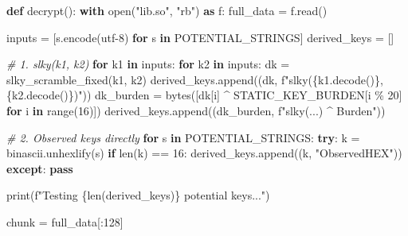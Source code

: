 \documentclass[
]{article}
\newenvironment{Shaded}{}{}
\newcommand{\BuiltInTok}[1]{\textcolor[rgb]{0.00,0.50,0.00}{#1}}
\newcommand{\CommentTok}[1]{\textcolor[rgb]{0.38,0.63,0.69}{\textit{#1}}}
\newcommand{\ControlFlowTok}[1]{\textcolor[rgb]{0.00,0.44,0.13}{\textbf{#1}}}
\newcommand{\DecValTok}[1]{\textcolor[rgb]{0.25,0.63,0.44}{#1}}
\newcommand{\ImportTok}[1]{\textcolor[rgb]{0.00,0.50,0.00}{\textbf{#1}}}
\newcommand{\KeywordTok}[1]{\textcolor[rgb]{0.00,0.44,0.13}{\textbf{#1}}}
\newcommand{\NormalTok}[1]{#1}
\newcommand{\OperatorTok}[1]{\textcolor[rgb]{0.40,0.40,0.40}{#1}}
\newcommand{\SpecialCharTok}[1]{\textcolor[rgb]{0.25,0.44,0.63}{#1}}
\newcommand{\SpecialStringTok}[1]{\textcolor[rgb]{0.73,0.40,0.53}{#1}}
\newcommand{\StringTok}[1]{\textcolor[rgb]{0.25,0.44,0.63}{#1}}
\begin{document}
\begin{Shaded}
\begin{Highlighting}[]
\KeywordTok{def}\NormalTok{ decrypt():}
    \ControlFlowTok{with} \BuiltInTok{open}\NormalTok{(}\StringTok{"lib.so"}\NormalTok{, }\StringTok{"rb"}\NormalTok{) }\ImportTok{as}\NormalTok{ f:}
\NormalTok{        full\_data }\OperatorTok{=}\NormalTok{ f.read()}
    
\NormalTok{    inputs }\OperatorTok{=}\NormalTok{ [s.encode(}\StringTok{\textquotesingle{}utf{-}8\textquotesingle{}}\NormalTok{) }\ControlFlowTok{for}\NormalTok{ s }\KeywordTok{in}\NormalTok{ POTENTIAL\_STRINGS]}
\NormalTok{    derived\_keys }\OperatorTok{=}\NormalTok{ []}
    
    \CommentTok{\# 1. slky(k1, k2)}
    \ControlFlowTok{for}\NormalTok{ k1 }\KeywordTok{in}\NormalTok{ inputs:}
        \ControlFlowTok{for}\NormalTok{ k2 }\KeywordTok{in}\NormalTok{ inputs:}
\NormalTok{            dk }\OperatorTok{=}\NormalTok{ slky\_scramble\_fixed(k1, k2)}
\NormalTok{            derived\_keys.append((dk, }\SpecialStringTok{f"slky(}\SpecialCharTok{\{}\NormalTok{k1}\SpecialCharTok{.}\NormalTok{decode()}\SpecialCharTok{\}}\SpecialStringTok{,}\SpecialCharTok{\{}\NormalTok{k2}\SpecialCharTok{.}\NormalTok{decode()}\SpecialCharTok{\}}\SpecialStringTok{)"}\NormalTok{))}
\NormalTok{            dk\_burden }\OperatorTok{=} \BuiltInTok{bytes}\NormalTok{([dk[i] }\OperatorTok{\^{}}\NormalTok{ STATIC\_KEY\_BURDEN[i }\OperatorTok{\%} \DecValTok{20}\NormalTok{] }\ControlFlowTok{for}\NormalTok{ i }\KeywordTok{in} \BuiltInTok{range}\NormalTok{(}\DecValTok{16}\NormalTok{)])}
\NormalTok{            derived\_keys.append((dk\_burden, }\SpecialStringTok{f"slky(...) \^{} Burden"}\NormalTok{))}
            
    \CommentTok{\# 2. Observed keys directly}
    \ControlFlowTok{for}\NormalTok{ s }\KeywordTok{in}\NormalTok{ POTENTIAL\_STRINGS:}
        \ControlFlowTok{try}\NormalTok{:}
\NormalTok{            k }\OperatorTok{=}\NormalTok{ binascii.unhexlify(s)}
            \ControlFlowTok{if} \BuiltInTok{len}\NormalTok{(k) }\OperatorTok{==} \DecValTok{16}\NormalTok{:}
\NormalTok{                derived\_keys.append((k, }\StringTok{"ObservedHEX"}\NormalTok{))}
        \ControlFlowTok{except}\NormalTok{: }\ControlFlowTok{pass}

    \BuiltInTok{print}\NormalTok{(}\SpecialStringTok{f"Testing }\SpecialCharTok{\{}\BuiltInTok{len}\NormalTok{(derived\_keys)}\SpecialCharTok{\}}\SpecialStringTok{ potential keys..."}\NormalTok{)}
    
\NormalTok{    chunk }\OperatorTok{=}\NormalTok{ full\_data[:}\DecValTok{128}\NormalTok{]}
    

\end{Highlighting}
\end{Shaded}
\end{document}
